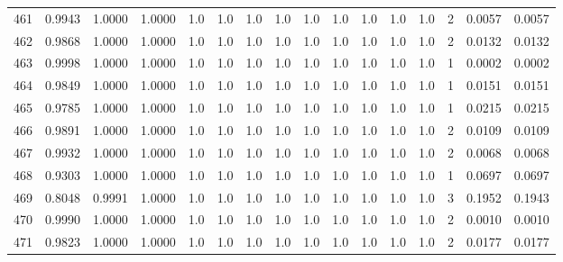\begin{tabular}{lrrrrrrrrrrrrrrr}
461 &      0.9943 &  1.0000 &  1.0000 &     1.0 &     1.0 &     1.0 &     1.0 &     1.0 &     1.0 &     1.0 &      1.0 &        1.0 &      2 &                    0.0057 &                     0.0057 \\
462 &      0.9868 &  1.0000 &  1.0000 &     1.0 &     1.0 &     1.0 &     1.0 &     1.0 &     1.0 &     1.0 &      1.0 &        1.0 &      2 &                    0.0132 &                     0.0132 \\
463 &      0.9998 &  1.0000 &  1.0000 &     1.0 &     1.0 &     1.0 &     1.0 &     1.0 &     1.0 &     1.0 &      1.0 &        1.0 &      1 &                    0.0002 &                     0.0002 \\
464 &      0.9849 &  1.0000 &  1.0000 &     1.0 &     1.0 &     1.0 &     1.0 &     1.0 &     1.0 &     1.0 &      1.0 &        1.0 &      1 &                    0.0151 &                     0.0151 \\
465 &      0.9785 &  1.0000 &  1.0000 &     1.0 &     1.0 &     1.0 &     1.0 &     1.0 &     1.0 &     1.0 &      1.0 &        1.0 &      1 &                    0.0215 &                     0.0215 \\
466 &      0.9891 &  1.0000 &  1.0000 &     1.0 &     1.0 &     1.0 &     1.0 &     1.0 &     1.0 &     1.0 &      1.0 &        1.0 &      2 &                    0.0109 &                     0.0109 \\
467 &      0.9932 &  1.0000 &  1.0000 &     1.0 &     1.0 &     1.0 &     1.0 &     1.0 &     1.0 &     1.0 &      1.0 &        1.0 &      2 &                    0.0068 &                     0.0068 \\
468 &      0.9303 &  1.0000 &  1.0000 &     1.0 &     1.0 &     1.0 &     1.0 &     1.0 &     1.0 &     1.0 &      1.0 &        1.0 &      1 &                    0.0697 &                     0.0697 \\
469 &      0.8048 &  0.9991 &  1.0000 &     1.0 &     1.0 &     1.0 &     1.0 &     1.0 &     1.0 &     1.0 &      1.0 &        1.0 &      3 &                    0.1952 &                     0.1943 \\
470 &      0.9990 &  1.0000 &  1.0000 &     1.0 &     1.0 &     1.0 &     1.0 &     1.0 &     1.0 &     1.0 &      1.0 &        1.0 &      2 &                    0.0010 &                     0.0010 \\
471 &      0.9823 &  1.0000 &  1.0000 &     1.0 &     1.0 &     1.0 &     1.0 &     1.0 &     1.0 &     1.0 &      1.0 &        1.0 &      2 &                    0.0177 &                     0.0177 \\

\end{tabular}
